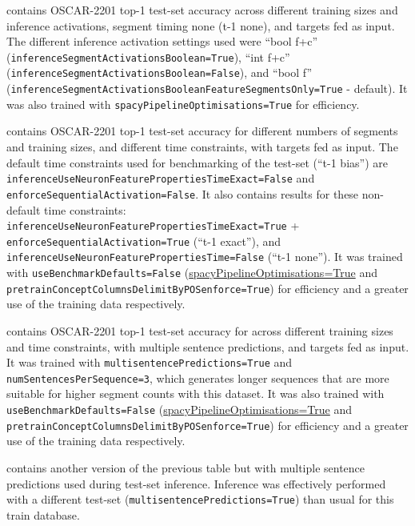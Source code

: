  contains OSCAR-2201 top-1 test-set accuracy across different training sizes and inference activations, segment timing none (t-1 none), and targets fed as input. The different inference activation settings used were ``bool f+c'' (\texttt{inferenceSegmentActivationsBoolean=True}), ``int f+c'' (\texttt{inferenceSegmentActivationsBoolean=False}), and ``bool f'' (\texttt{inferenceSegmentActivationsBooleanFeatureSegmentsOnly=True} - default). It was also trained with \texttt{spacyPipelineOptimisations=True} for efficiency.

 contains OSCAR-2201 top-1 test-set accuracy for different numbers of segments and training sizes, and different time constraints, with targets fed as input.  The default time constraints used for benchmarking of the test-set (``t-1 bias'') are \texttt{inferenceUseNeuronFeaturePropertiesTimeExact=False} and \texttt{enforceSequentialActivation=False}. It also contains results for these non-default time constraints: \texttt{inferenceUseNeuronFeaturePropertiesTimeExact=True} +  \texttt{enforceSequentialActivation=True} (``t-1 exact''), and \texttt{inferenceUseNeuronFeaturePropertiesTime=False} (``t-1 none''). It was trained with \texttt{useBenchmarkDefaults=False} (\url{spacyPipelineOptimisations=True} and \texttt{pretrainConceptColumnsDelimitByPOSenforce=True}) for efficiency and a greater use of the training data respectively.

 contains OSCAR-2201 top-1 test-set accuracy for across different training sizes and time constraints, with multiple sentence predictions, and targets fed as input. It was trained with \texttt{multisentencePredictions=True} and \texttt{numSentencesPerSequence=3}, which generates longer sequences that are more suitable for higher segment counts with this dataset. It was also trained with \texttt{useBenchmarkDefaults=False} (\url{spacyPipelineOptimisations=True} and \texttt{pretrainConceptColumnsDelimitByPOSenforce=True}) for efficiency and a greater use of the training data respectively.

 contains another version of the previous table but with multiple sentence predictions used during test-set inference. Inference was effectively performed with a different test-set (\texttt{multisentencePredictions=True}) than usual for this train database.

